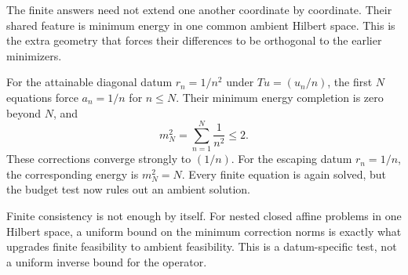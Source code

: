 The finite answers need not extend one another coordinate by coordinate. Their shared feature is minimum energy in one common ambient Hilbert space. This is the extra geometry that forces their differences to be orthogonal to the earlier minimizers.

For the attainable diagonal datum $r_n=1/n^2$ under $Tu=(u_n/n)$, the first $N$ equations force $a_n=1/n$ for $n\le N$. Their minimum energy completion is zero beyond $N$, and
\[
 m_N^2=\sum_{n=1}^{N}\frac1{n^2}\le2.
\]
These corrections converge strongly to $(1/n)$. For the escaping datum $r_n=1/n$, the corresponding energy is $m_N^2=N$. Every finite equation is again solved, but the budget test now rules out an ambient solution.


\begin{insight}
Finite consistency is not enough by itself. For nested closed affine problems in one Hilbert space, a uniform bound on the minimum correction norms is exactly what upgrades finite feasibility to ambient feasibility. This is a datum-specific test, not a uniform inverse bound for the operator.
\end{insight}
